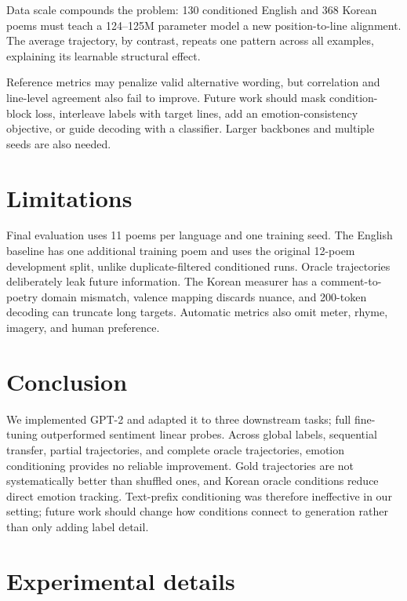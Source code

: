 \documentclass{article}
\begin{document}
Data scale compounds the problem: 130 conditioned English and 368 Korean poems must teach a 124--125M parameter model a new position-to-line alignment. The average trajectory, by contrast, repeats one pattern across all examples, explaining its learnable structural effect.

Reference metrics may penalize valid alternative wording, but correlation and line-level agreement also fail to improve. Future work should mask condition-block loss, interleave labels with target lines, add an emotion-consistency objective, or guide decoding with a classifier. Larger backbones and multiple seeds are also needed.

\section{Limitations}

Final evaluation uses 11 poems per language and one training seed. The English baseline has one additional training poem and uses the original 12-poem development split, unlike duplicate-filtered conditioned runs. Oracle trajectories deliberately leak future information. The Korean measurer has a comment-to-poetry domain mismatch, valence mapping discards nuance, and 200-token decoding can truncate long targets. Automatic metrics also omit meter, rhyme, imagery, and human preference.

\section{Conclusion}

We implemented GPT-2 and adapted it to three downstream tasks; full fine-tuning outperformed sentiment linear probes. Across global labels, sequential transfer, partial trajectories, and complete oracle trajectories, emotion conditioning provides no reliable improvement. Gold trajectories are not systematically better than shuffled ones, and Korean oracle conditions reduce direct emotion tracking. Text-prefix conditioning was therefore ineffective in our setting; future work should change how conditions connect to generation rather than only adding label detail.




\clearpage
\appendix
\section{Experimental details}
\end{document}

